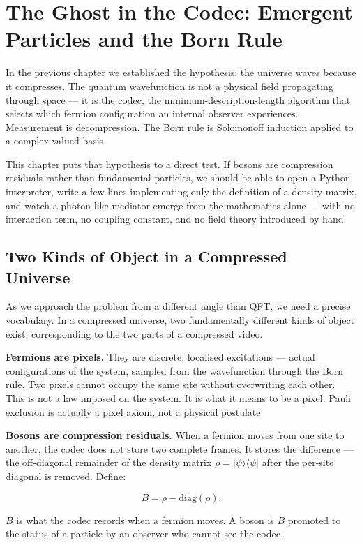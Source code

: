 \chapter{The Ghost in the Codec: Emergent Particles and the Born Rule}

In the previous chapter we established the hypothesis: the universe
waves because it compresses. The quantum wavefunction is not a physical
field propagating through space --- it is the codec, the
minimum-description-length algorithm that selects which fermion
configuration an internal observer experiences. Measurement is
decompression. The Born rule is Solomonoff induction applied to a
complex-valued basis.

This chapter puts that hypothesis to a direct test. If bosons are
compression residuals rather than fundamental particles, we should be
able to open a Python interpreter, write a few lines implementing only
the definition of a density matrix, and watch a photon-like mediator
emerge from the mathematics alone --- with no interaction term, no
coupling constant, and no field theory introduced by hand.


\section{Two Kinds of Object in a Compressed Universe}

As we approach the problem from a different angle than QFT, we need a precise vocabulary.
In a compressed universe, two fundamentally different kinds of object exist,
corresponding to the two parts of a compressed video.

\textbf{Fermions are pixels.} They are discrete, localised excitations
--- actual configurations of the system, sampled from the wavefunction
through the Born rule. Two pixels cannot occupy the same site without
overwriting each other. This is not a law imposed on the system. It is
what it means to be a pixel. Pauli exclusion is actually a pixel axiom, not a
physical postulate.

\textbf{Bosons are compression residuals.} When a fermion moves from
one site to another, the codec does not store two complete frames. It
stores the difference --- the off-diagonal remainder of the density
matrix $\rho = |\psi\rangle\langle\psi|$ after the per-site diagonal is
removed. Define:

\[
B = \rho - \mathrm{diag}(\rho).
\]

$B$ is what the codec records when a fermion moves. A boson is $B$
promoted to the status of a particle by an observer who cannot see the
codec.

